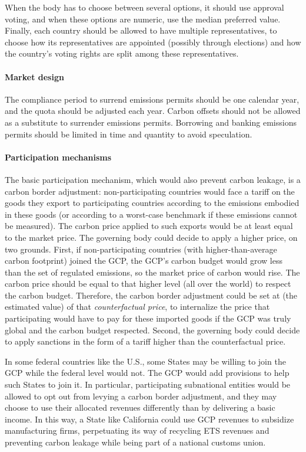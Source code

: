 \documentclass[12pt,english]{article}
\begin{document}
When the body has to choose between several options, it should use approval voting, and when these options are numeric, use the median preferred value. Finally, each country should be allowed to have multiple representatives, to choose how its representatives are appointed (possibly through elections) and how the country's voting rights are split among these representatives. 

\paragraph{Market design} 
The compliance period to surrend emissions permits should be one calendar year, and the quota should be adjusted each year. Carbon offsets should not be allowed as a substitute to surrender emissions permits. Borrowing and banking emissions permits should be limited in time and quantity to avoid speculation. %

\paragraph{Participation mechanisms}

The basic participation mechanism, which would also prevent carbon leakage, is a carbon border adjustment: non-participating countries would face a tariff on the goods they export to participating countries according to the emissions embodied in these goods (or according to a worst-case benchmark if these emissions cannot be measured). The carbon price applied to such exports would be at least equal to the market price. The governing body could decide to apply a higher price, on two grounds. First, if non-participating countries (with higher-than-average carbon footprint) joined the GCP, the GCP's carbon budget would grow less than the set of regulated emissions, so the market price of carbon would rise. The carbon price should be equal to that higher level (all over the world) to respect the carbon budget. Therefore, the carbon border adjustment could be set at (the estimated value) of that \textit{counterfactual price}, to internalize the price that participating would have to pay for these imported goods if the GCP was truly global and the carbon budget respected. Second, the governing body could decide to apply sanctions in the form of a tariff higher than the counterfactual price. 

In some federal countries like the U.S., some States may be willing to join the GCP while the federal level would not. The GCP would add provisions to help such States to join it. In particular, participating subnational entities would be allowed to opt out from levying a carbon border adjustment, and they may choose %
to use their allocated revenues differently than by delivering a basic income. 
In this way, a State like California could use GCP revenues to subsidize manufacturing firms, perpetuating its way of recycling ETS revenues and preventing carbon leakage while being part of a national customs union. 
\end{document}
